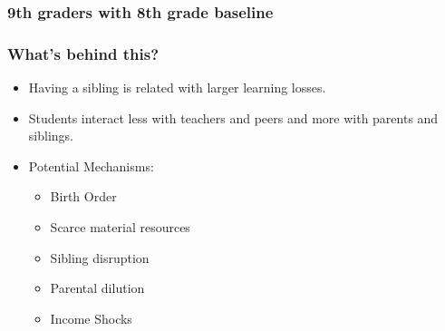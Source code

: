 \documentclass{beamer}
\begin{document}
\begin{frame}
    \label{frame:twfe_gpa_controls_4}
    \frametitle{9th graders with 8th grade baseline}
        {
    }

    \begin{flushleft}
        \hyperlink{frame:twfe_gpa_controls}{}
    \end{flushleft}       
\end{frame}


\begin{frame}
    \label{frame:mechanisms}
    \frametitle{What's behind this?}
\begin{itemize}
    \item Having a sibling is related with larger learning losses.
    \item Students interact less with teachers and peers and more with parents and siblings.
    \item Potential Mechanisms:   
    \begin{itemize}
        \item Birth Order
        \item Scarce material resources
        \item Sibling disruption
        \item Parental dilution
        \item Income Shocks
    \end{itemize} 
\end{itemize}
\end{frame}
\end{document}
